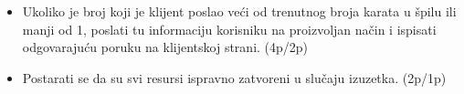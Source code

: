 \documentclass[]{article}
\begin{document}
\begin{enumerate}
\begin{itemize}
    \item Ukoliko je broj koji je klijent poslao ve\'c{}i od trenutnog broja karata u \v{s}pilu ili manji od 1, poslati tu informaciju korisniku na proizvoljan na\v{c}in i ispisati odgovaraju\'c{}u poruku na klijentskoj strani. \hfill (4p/2p)
    \item Postarati se da su svi resursi ispravno zatvoreni u slu\v{c}aju izuzetka. \hfill (2p/1p)
  \end{itemize}

\end{enumerate}
\end{document}
